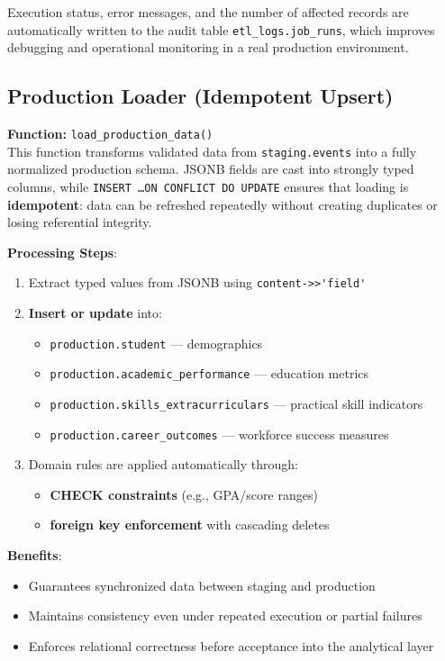 \documentclass[11pt]{article}
\begin{document}
Execution status, error messages, and the number of affected records are automatically written to the audit table \texttt{etl\_logs.job\_runs}, which improves debugging and operational monitoring in a real production environment.

\subsection*{Production Loader (Idempotent Upsert)}

\textbf{Function:} \texttt{load\_production\_data()}\\[4pt]
This function transforms validated data from \texttt{staging.events} into a fully normalized production schema. JSONB fields are cast into strongly typed columns, while \texttt{INSERT \ldots ON CONFLICT DO UPDATE} ensures that loading is \textbf{idempotent}: data can be refreshed repeatedly without creating duplicates or losing referential integrity.

\textbf{Processing Steps}:
\begin{enumerate}[leftmargin=1.6em]
\item Extract typed values from JSONB using
      \verb|content->>'field'|
\item \textbf{Insert or update} into:
    \begin{itemize}
      \item \texttt{production.student} — demographics
      \item \texttt{production.academic\_performance} — education metrics
      \item \texttt{production.skills\_extracurriculars} — practical skill indicators
      \item \texttt{production.career\_outcomes} — workforce success measures
    \end{itemize}
\item Domain rules are applied automatically through:
    \begin{itemize}
      \item \textbf{CHECK constraints} (e.g., GPA/score ranges)
      \item \textbf{foreign key enforcement} with cascading deletes
    \end{itemize}
\end{enumerate}

\textbf{Benefits}:
\begin{itemize}
\item Guarantees synchronized data between staging and production
\item Maintains consistency even under repeated execution or partial failures
\item Enforces relational correctness before acceptance into the analytical layer
\end{itemize}
\end{document}
